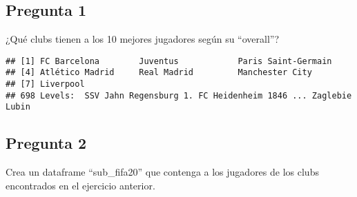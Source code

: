 \documentclass[
]{article}
\newenvironment{Shaded}{\begin{snugshade}}{\end{snugshade}}
\newcommand{\DataTypeTok}[1]{\textcolor[rgb]{0.13,0.29,0.53}{#1}}
\newcommand{\DecValTok}[1]{\textcolor[rgb]{0.00,0.00,0.81}{#1}}
\newcommand{\KeywordTok}[1]{\textcolor[rgb]{0.13,0.29,0.53}{\textbf{#1}}}
\newcommand{\NormalTok}[1]{#1}
\newcommand{\OperatorTok}[1]{\textcolor[rgb]{0.81,0.36,0.00}{\textbf{#1}}}
\newcommand{\OtherTok}[1]{\textcolor[rgb]{0.56,0.35,0.01}{#1}}
\newcommand{\StringTok}[1]{\textcolor[rgb]{0.31,0.60,0.02}{#1}}
\begin{document}
\hypertarget{pregunta-1}{%
\subsection{Pregunta 1}\label{pregunta-1}}

¿Qué clubs tienen a los 10 mejores jugadores según su ``overall''?

\begin{Shaded}
\end{Shaded}

\begin{Shaded}
\end{Shaded}

\begin{verbatim}
## [1] FC Barcelona        Juventus            Paris Saint-Germain
## [4] Atlético Madrid     Real Madrid         Manchester City    
## [7] Liverpool          
## 698 Levels:  SSV Jahn Regensburg 1. FC Heidenheim 1846 ... Zaglebie Lubin
\end{verbatim}

\hypertarget{pregunta-2}{%
\subsection{Pregunta 2}\label{pregunta-2}}

Crea un dataframe ``sub\_fifa20'' que contenga a los jugadores de los
clubs encontrados en el ejercicio anterior.
\end{document}

